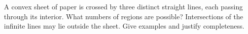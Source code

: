 A convex sheet of paper is crossed by three distinct straight lines, each passing through its interior. What numbers of regions are possible? Intersections of the infinite lines may lie outside the sheet. Give examples and justify completeness.
